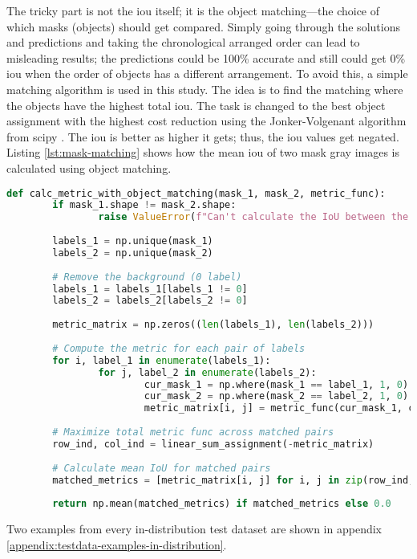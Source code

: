 		The tricky part is not the \ac{iou} itself; it is the object matching—the choice of which masks (objects) should get compared. Simply going through the solutions and predictions and taking the chronological arranged order can lead to misleading results; the predictions could be 100\% accurate and still could get 0\% \ac{iou} when the order of objects has a different arrangement. To avoid this, a simple matching algorithm is used in this study. The idea is to find the matching where the objects have the highest total \ac{iou}. The task is changed to the best object assignment with the highest cost reduction using the Jonker-Volgenant algorithm \cite{Jonker1987} from scipy \cite{scipy}. The \ac{iou} is better as higher it gets; thus, the \ac{iou} values get negated. Listing \ref{lst:mask-matching} shows how the mean \ac{iou} of two mask gray images is calculated using object matching.
		\begin{lstlisting}[language=Python,caption=Calculate the mean \acl{iou} between two mask images using mask matching, label=lst:mask-matching]
def calc_metric_with_object_matching(mask_1, mask_2, metric_func):
		if mask_1.shape != mask_2.shape:
				raise ValueError(f"Can't calculate the IoU between the 2 masks because of different shapes: {mask_1.shape} and {mask_2.shape}")
		
		labels_1 = np.unique(mask_1)
		labels_2 = np.unique(mask_2)
		
		# Remove the background (0 label)
		labels_1 = labels_1[labels_1 != 0]
		labels_2 = labels_2[labels_2 != 0]
		
		metric_matrix = np.zeros((len(labels_1), len(labels_2)))
		
		# Compute the metric for each pair of labels
		for i, label_1 in enumerate(labels_1):
				for j, label_2 in enumerate(labels_2):
						cur_mask_1 = np.where(mask_1 == label_1, 1, 0)
						cur_mask_2 = np.where(mask_2 == label_2, 1, 0)
						metric_matrix[i, j] = metric_func(cur_mask_1, cur_mask_2)
		
		# Maximize total metric func across matched pairs
		row_ind, col_ind = linear_sum_assignment(-metric_matrix)
		
		# Calculate mean IoU for matched pairs
		matched_metrics = [metric_matrix[i, j] for i, j in zip(row_ind, 
																																	col_ind)]
		return np.mean(matched_metrics) if matched_metrics else 0.0
		\end{lstlisting}
		
		Two examples from every in-distribution test dataset are shown in appendix \ref{appendix:testdata-examples-in-distribution}.
	
